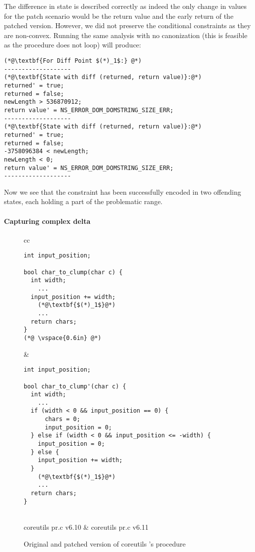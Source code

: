 The difference in state is described correctly as indeed the only change in values for the patch scenario would be the return value and the early return of the patched version. However, we did not preserve the conditional constraints as they are non-convex. Running the same analysis with no canonization (this is feasible as the procedure does not loop) will produce:
\begin{lstlisting}
(*@\textbf{For Diff Point $(*)_1$:} @*)
-------------------
(*@\textbf{State with diff (returned, return value)}:@*)
returned' = true;
returned = false;
newLength > 536870912;
return value' = NS_ERROR_DOM_DOMSTRING_SIZE_ERR;
-------------------
(*@\textbf{State with diff (returned, return value)}:@*)
returned' = true;
returned = false;
-3758096384 < newLength;
newLength < 0;
return value' = NS_ERROR_DOM_DOMSTRING_SIZE_ERR;
-------------------
\end{lstlisting}
Now we see that the  constraint has been successfully encoded in two offending states, each holding a part of the problematic range.

\paragraph{Capturing complex delta}
\begin{figure*}
\centering
\begin{tabular}{cc}
\begin{lstlisting}
int input_position;

bool char_to_clump(char c) {
  int width;
    ...
  input_position += width;
    (*@\textbf{$(*)_1$}@*)
    ...
  return chars;
}
(*@ \vspace{0.6in} @*)
\end{lstlisting}
\hspace{1.0in}
&
\begin{lstlisting}
int input_position;

bool char_to_clump'(char c) {
  int width;
    ...
  if (width < 0 && input_position == 0) {
      chars = 0;
      input_position = 0;
  } else if (width < 0 && input_position <= -width) {
    input_position = 0;
  } else {
    input_position += width;
  }
    (*@\textbf{$(*)_1$}@*)
    ...
  return chars;
}
\end{lstlisting}
\\
coreutils pr.c v6.10 & coreutils pr.c v6.11
\end{tabular}
\caption{Original and patched version of coreutils 's  procedure}
\end{figure*}

